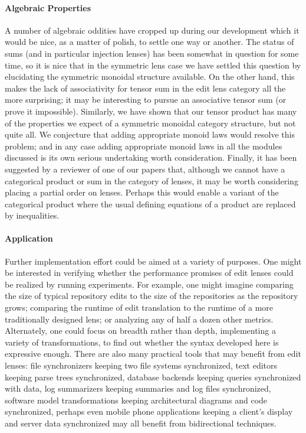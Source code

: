 \paragraph*{Algebraic Properties}
A number of algebraic oddities have cropped up during our development which
it would be nice, as a matter of polish, to settle one way or another. The
status of sums (and in particular injection lenses) has been somewhat in
question for some time, so it is nice that in the symmetric lens case we
have settled this question by elucidating the symmetric monoidal structure
available. On the other hand, this makes the lack of associativity for
tensor sum in the edit lens category all the more surprising; it may be
interesting to pursue an associative tensor sum (or prove it impossible).
Similarly, we have shown that our tensor product has many of the properties
we expect of a symmetric monoidal category structure, but not quite all. We
conjecture that adding appropriate monoid laws would resolve this problem;
and in any case adding appropriate monoid laws in all the modules discussed
is its own serious undertaking worth consideration. Finally, it has been
suggested by a reviewer of one of our papers that, although we cannot have a
categorical product or sum in the category of lenses, it may be worth
considering placing a partial order on lenses. Perhaps this would enable a
variant of the categorical product where the usual defining equations of a
product are replaced by inequalities.

\paragraph*{Application}
Further implementation effort could be aimed at a variety of purposes.
One might be interested in verifying whether the performance promises of
edit lenses could be realized by running experiments. For example, one might
imagine comparing the size of typical repository edits to the size of the
repositories as the repository grows; comparing the runtime of edit
translation to the runtime of a more traditionally designed lens; or
analyzing any of half a dozen other metrics. Alternately, one could focus on
breadth rather than depth, implementing a variety of transformations, to
find out whether the syntax developed here is expressive enough. There are
also many practical tools that may benefit from edit lenses: file
synchronizers keeping two file systems synchronized, text editors keeping
parse trees synchronized, database backends keeping queries synchronized
with data, log summarizers keeping summaries and log files synchronized,
software model transformations keeping architectural diagrams and code
synchronized, perhaps even mobile phone applications keeping a client's
display and server data synchronized may all benefit from bidirectional
techniques.

